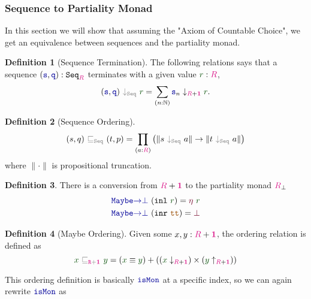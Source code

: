 \documentclass[twoside,11pt,openright]{report}
\theoremstyle{plain} %
\theoremstyle{definition}
\newtheorem{defn}{Definition}[section]
\theoremstyle{remark}
\newcommand*{\term}[1]{\textcolor{green!30!black}{#1}} %
\newcommand*{\type}[1]{\textcolor{magenta!90!black}{#1}}
\newcommand*{\unit}{\type{\textbf{1}}}
\newcommand*{\relation}[1]{\textcolor{gray}{\ensuremath{\mathtt{#1}}}}
\newcommand*{\constant}[1]{\textcolor{orange!60!black}{\ensuremath{\mathtt{#1}}}}
\newcommand*{\function}[1]{\textcolor{blue!60!black}{\ensuremath{\mathtt{#1}}}}
\newcommand*{\constructor}[1]{\textcolor{purple!60!black}{\ensuremath{\mathtt{#1}}}}
\newcommand*{\typeformer}[1]{\ensuremath{\mathtt{#1}}}
\begin{document}
\subsubsection{Sequence to Partiality Monad}
In this section we will show that assuming the "Axiom of Countable Choice", we get an equivalence between sequences and the partiality monad.
\begin{defn}[Sequence Termination]
  The following relations says that a sequence \((\function{s},\function{q}) : \typeformer{Seq}_{\type{R}}\) terminates with a given value \(\term{r} : \type{R}\),
  \begin{equation}
    (\function{s},\function{q})~\relation{\downarrow_{\mathtt{Seq}}}~\term{r} = \sum_{(n : \mathbb{N})} \function{s}_n \downarrow_{\type{R} + \unit} \term{r}.
  \end{equation}
\end{defn}
\begin{defn}[Sequence Ordering]
\begin{equation}
  (s,q)~\relation{\sqsubseteq_{\mathtt{Seq}}}~(t,p) = \prod_{(a : \type{R})} \left(\|s~\relation{\downarrow_{\mathtt{Seq}}}~a\| \rightarrow \| t~\relation{\downarrow_{\mathtt{Seq}}}~a\|\right)
\end{equation}
where \(\| \cdot \|\) is propositional  truncation.
\end{defn}
\begin{defn} There is a conversion from \(\type{R} + \unit\) to the partiality monad \(\type{R}_\bot\)
  \begin{equation}
    \begin{aligned}
      &\function{Maybe{\rightarrow}\bot}~(\mathtt{inl}~\term{r}) = \constructor{\eta}~\term{r} \\
      &\function{Maybe{\rightarrow}\bot}~(\mathtt{inr}~\constant{tt}) = \constructor{\bot}
    \end{aligned}
  \end{equation}
\end{defn}
\begin{defn}[Maybe Ordering] Given some \(x,y : \type{R} + \unit\), the ordering relation is defined as
\begin{equation}
  \term{x}~\relation{\sqsubseteq_{\type{R} + \unit}}~\term{y} = (\term{x} \equiv \term{y}) + ((\term{x}  \downarrow_{\type{R} + \unit}) \times (\term{y} \uparrow_{\type{R} + \unit}))
\end{equation}
\end{defn}
\noindent This ordering definition is basically \(\function{isMon}\) at a specific index, so we can again rewrite \(\function{isMon}\) as
\end{document}
